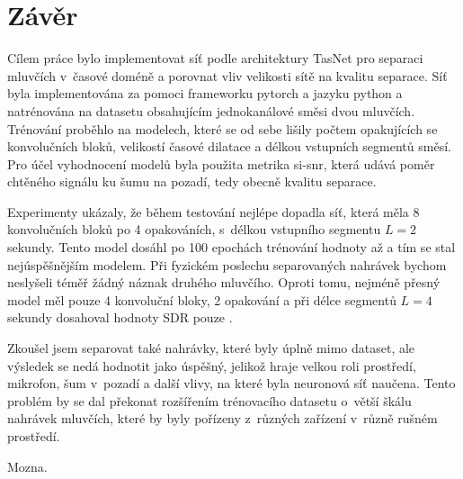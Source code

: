 \chapter{Závěr}
\label{zaver}

Cílem práce bylo implementovat síť podle architektury TasNet pro separaci mluvčích v~časové doméně a porovnat vliv velikosti sítě na kvalitu separace. Síť byla implementována za pomoci frameworku pytorch a jazyku python a natrénována na datasetu obsahujícím jednokanálové směsi dvou mluvčích. Trénování proběhlo na  modelech, které se od sebe lišily počtem opakujících se konvolučních bloků, velikostí časové dilatace a délkou vstupních segmentů směsí. Pro účel vyhodnocení modelů byla použita metrika si-snr, která udává poměr chtěného signálu ku šumu na pozadí, tedy obecně kvalitu separace. 

Experimenty ukázaly, že během testování nejlépe dopadla síť, která měla 8 konvolučních bloků po 4 opakováních, s~délkou vstupního segmentu $L=2$ sekundy. Tento model dosáhl po 100 epochách trénování hodnoty až  a tím se stal nejúspěšnějším modelem. Při fyzickém poslechu separovaných nahrávek bychom neslyšeli téměř žádný náznak druhého mluvčího. Oproti tomu, nejméně přesný model měl pouze 4 konvoluční bloky, 2 opakování a při délce segmentů $L=4$ sekundy dosahoval hodnoty SDR pouze .

Zkoušel jsem separovat také nahrávky, které byly úplně mimo dataset, ale výsledek se nedá hodnotit jako úspěšný, jelikož hraje velkou roli prostředí, mikrofon, šum v~pozadí a další vlivy, na které byla neuronová síť naučena. Tento problém by se dal překonat rozšířením trénovacího datasetu o~větší škálu nahrávek mluvčích, které by byly pořízeny z~různých zařízení v~různě rušném prostředí.

Mozna.


